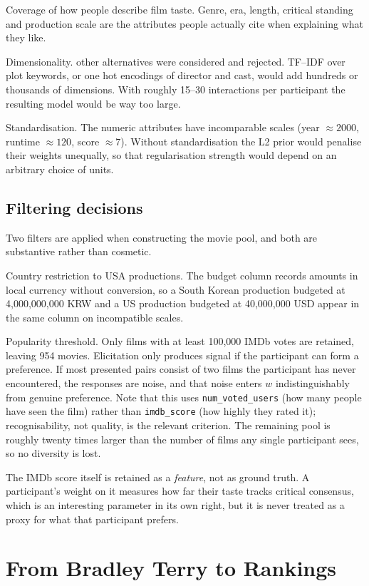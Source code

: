 \documentclass[11pt]{article}
\begin{document}
Coverage of how people describe film taste. Genre, era, length, critical standing and production scale are the attributes people actually cite when explaining what they like.

Dimensionality. other alternatives were considered and rejected. TF--IDF over plot keywords, or one hot encodings of director and cast, would add hundreds or thousands of dimensions. With roughly 15--30 interactions per participant the resulting model would be way too large.

Standardisation. The numeric attributes have incomparable scales (year $\approx 2000$, runtime $\approx 120$, score $\approx 7$). Without standardisation the L2 prior would penalise their weights unequally, so that regularisation strength would depend on an arbitrary choice of units.

\subsection{Filtering decisions}
Two filters are applied when constructing the movie pool, and both are substantive rather than cosmetic.

Country restriction to USA productions. The budget column records amounts in local currency without conversion, so a South Korean production budgeted at 4{,}000{,}000{,}000 KRW and a US production budgeted at 40{,}000{,}000 USD appear in the same column on incompatible scales.

Popularity threshold. Only films with at least 100{,}000 IMDb votes are retained, leaving 954 movies. Elicitation only produces signal if the participant can form a preference. If most presented pairs consist of two films the participant has never encountered, the responses are noise, and that noise enters $w$ indistinguishably from genuine preference. Note that this uses \texttt{num\_voted\_users} (how many people have seen the film) rather than \texttt{imdb\_score} (how highly they rated it); recognisability, not quality, is the relevant criterion. The remaining pool is roughly twenty times larger than the number of films any single participant sees, so no diversity is lost.

The IMDb score itself is retained as a \emph{feature}, not as ground truth. A participant's weight on it measures how far their taste tracks critical consensus, which is an interesting parameter in its own right, but it is never treated as a proxy for what that participant prefers.

\section{From Bradley Terry to Rankings}
\label{sec:model}
\end{document}
